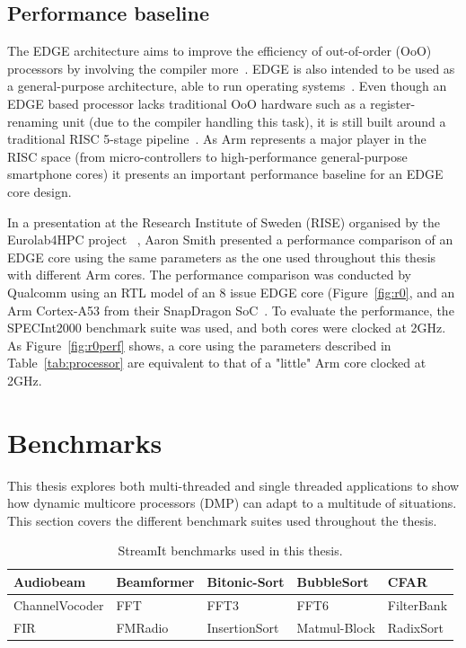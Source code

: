\subsection{Performance baseline}
The EDGE architecture aims to improve the efficiency of out-of-order (OoO) processors by involving the compiler more~\cite{aarontalk, gray2018edge}.
EDGE is also intended to be used as a general-purpose architecture, able to run operating systems~\cite{aarontalk}.
Even though an EDGE based processor lacks traditional OoO hardware such as a register-renaming unit (due to the compiler handling this task), it is still built around a traditional RISC 5-stage pipeline~\cite{gray2018edge}.
As Arm represents a major player in the RISC space (from micro-controllers to high-performance general-purpose smartphone cores) it presents an important performance baseline for an EDGE core design.

In a presentation at the Research Institute of Sweden (RISE) organised by the Eurolab4HPC project~\cite{eurolab4hpc, aarontalk} , Aaron Smith presented a performance comparison of an EDGE core using the same parameters as the one used throughout this thesis with different Arm cores.
The performance comparison was conducted by Qualcomm using an RTL model of an 8 issue EDGE core (Figure~\ref{fig:r0}, and an Arm Cortex-A53 from their SnapDragon SoC~\cite{aarontalk}.
To evaluate the performance, the SPECInt2000 benchmark suite was used, and both cores were clocked at 2GHz.
As Figure~\ref{fig:r0perf} shows, a core using the parameters described in Table~\ref{tab:processor} are equivalent to that of a "little" Arm core clocked at 2GHz.

\section{Benchmarks}
This thesis explores both multi-threaded and single threaded applications to show how dynamic multicore processors (DMP) can adapt to a multitude of situations. 
This section covers the different benchmark suites used throughout the thesis.

\begin{table}[t]
\centering
  \smaller
 \begin{tabular} { | l | l | l | l | l | }
 \hline
  Audiobeam&   Beamformer&  Bitonic-Sort  &  BubbleSort & CFAR \\ \hline
  ChannelVocoder &  FFT& FFT3 & FFT6&  FilterBank \\ \hline
  FIR &  FMRadio &   InsertionSort &   Matmul-Block &  RadixSort\\ \hline
 \end{tabular}
  \caption{StreamIt benchmarks used in this thesis.}\label{tab:streamwl}
\end{table}


